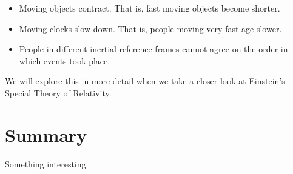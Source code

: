\begin{itemize}
\item Moving objects contract. That is, fast moving objects become shorter.
\item Moving clocks slow down. That is, people moving very fast age slower.
\item People in different inertial reference frames cannot agree on the order in which events took place. 
\end{itemize}
We will explore this in more detail when we take a closer look at Einstein's Special Theory of Relativity.

\newpage
\section{Summary}
\vspace{2cm}
\begin{chapterSummary}
\item Something interesting
\end{chapterSummary}